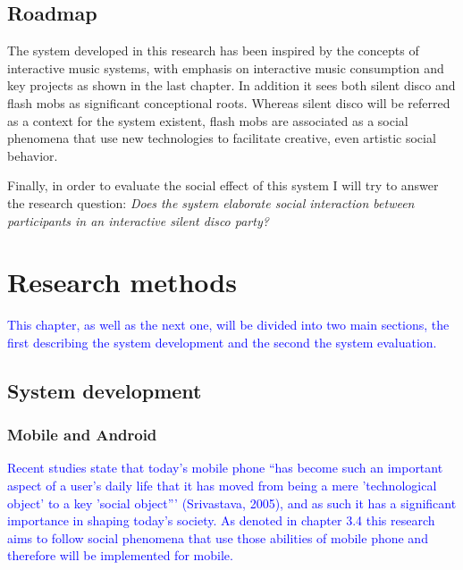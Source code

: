 \documentclass[a4paper,11pt]{article}
\newcommand{\new}[1]{\textcolor{blue}{#1}}
\begin{document}

\subsection{Roadmap}


The system developed in this research has been inspired by the concepts of interactive music systems, with emphasis on interactive music consumption and key projects as shown in the last chapter. In addition it sees both silent disco and flash mobs as significant conceptional roots. Whereas silent disco will be referred as a context for the system existent, flash mobs are associated as a social phenomena that use new technologies to facilitate creative, even artistic social behavior.


Finally, in order to evaluate the social effect of this system I will try to answer the research question: \emph{Does the system elaborate social interaction between participants in an interactive silent disco party?}

\section{Research methods}

\new{This chapter, as well as the next one, will be divided into two main sections, the first describing the system development and the second the system evaluation.}

\subsection{System development}

\subsubsection{Mobile and Android}


\new{Recent studies state that today's mobile phone ``has become such an important aspect of a user's daily life that it has moved from being a mere 'technological object' to a key 'social object''' (Srivastava, 2005), and as such it has a significant importance in shaping today's society. As denoted in chapter 3.4 this research aims to follow social phenomena that use those abilities of mobile phone and therefore will be implemented for mobile.}
\end{document}

